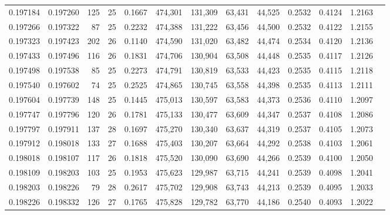 \begin{tabular}{rrrrrrrrrrrrr}
0.197184 & 0.197260 & 125 &  25 &                                     0.1667 & 474,301 & 131,309 &  63,431 &  44,525 & 0.2532 & 0.4124 & 1.2163 \\
0.197266 & 0.197322 &  87 &  25 &                                     0.2232 & 474,388 & 131,222 &  63,456 &  44,500 & 0.2532 & 0.4122 & 1.2155 \\
0.197323 & 0.197423 & 202 &  26 &                                     0.1140 & 474,590 & 131,020 &  63,482 &  44,474 & 0.2534 & 0.4120 & 1.2136 \\
0.197433 & 0.197496 & 116 &  26 &                                     0.1831 & 474,706 & 130,904 &  63,508 &  44,448 & 0.2535 & 0.4117 & 1.2126 \\
0.197498 & 0.197538 &  85 &  25 &                                     0.2273 & 474,791 & 130,819 &  63,533 &  44,423 & 0.2535 & 0.4115 & 1.2118 \\
0.197540 & 0.197602 &  74 &  25 &                                     0.2525 & 474,865 & 130,745 &  63,558 &  44,398 & 0.2535 & 0.4113 & 1.2111 \\
0.197604 & 0.197739 & 148 &  25 &                                     0.1445 & 475,013 & 130,597 &  63,583 &  44,373 & 0.2536 & 0.4110 & 1.2097 \\
0.197747 & 0.197796 & 120 &  26 &                                     0.1781 & 475,133 & 130,477 &  63,609 &  44,347 & 0.2537 & 0.4108 & 1.2086 \\
0.197797 & 0.197911 & 137 &  28 &                                     0.1697 & 475,270 & 130,340 &  63,637 &  44,319 & 0.2537 & 0.4105 & 1.2073 \\
0.197912 & 0.198018 & 133 &  27 &                                     0.1688 & 475,403 & 130,207 &  63,664 &  44,292 & 0.2538 & 0.4103 & 1.2061 \\
0.198018 & 0.198107 & 117 &  26 &                                     0.1818 & 475,520 & 130,090 &  63,690 &  44,266 & 0.2539 & 0.4100 & 1.2050 \\
0.198109 & 0.198203 & 103 &  25 &                                     0.1953 & 475,623 & 129,987 &  63,715 &  44,241 & 0.2539 & 0.4098 & 1.2041 \\
0.198203 & 0.198226 &  79 &  28 &                                     0.2617 & 475,702 & 129,908 &  63,743 &  44,213 & 0.2539 & 0.4095 & 1.2033 \\
0.198226 & 0.198332 & 126 &  27 &                                     0.1765 & 475,828 & 129,782 &  63,770 &  44,186 & 0.2540 & 0.4093 & 1.2022 \\

\end{tabular}

